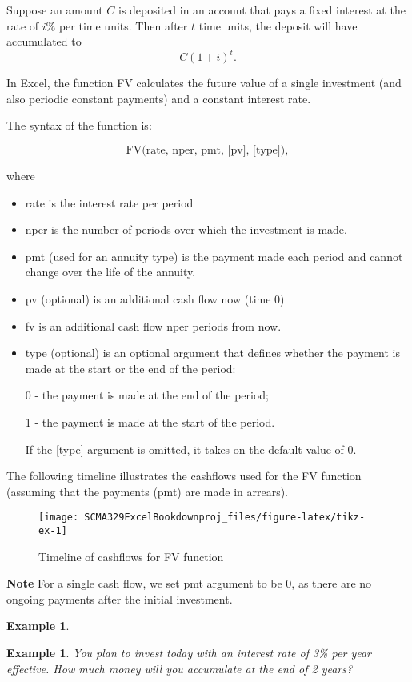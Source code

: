 \documentclass[
]{article}
\theoremstyle{definition}
\theoremstyle{definition}
\newtheorem{example}{Example}[section]
\theoremstyle{definition}
\theoremstyle{definition}
\theoremstyle{remark}
\begin{document}
Suppose an amount \(C\) is deposited in an account that pays a fixed
interest at the rate of \(i\)\% per time units. Then after \(t\) time units,
the deposit will have accumulated to \[C (1+i)^t.\]

In Excel, the function FV calculates the future value of a single
investment (and also periodic constant payments) and a constant interest
rate.

The syntax of the function is:

\[\text{FV(rate, nper, pmt, [pv], [type])},\]

where

\begin{itemize}
\item
  rate is the interest rate per period
\item
  nper is the number of periods over which the investment is made.
\item
  pmt (used for an annuity type) is the payment made each period and
  cannot change over the life of the annuity.
\item
  pv (optional) is an additional cash flow now (time 0)
\item
  fv is an additional cash flow nper periods from now.
\item
  type (optional) is an optional argument that defines whether the
  payment is made at the start or the end of the period:

  0 - the payment is made at the end of the period;

  1 - the payment is made at the start of the period.

  If the {[}type{]} argument is omitted, it takes on the default value
  of 0.
\end{itemize}

The following timeline illustrates the cashflows used for the FV
function (assuming that the payments (pmt) are made in arrears).

\begin{figure}

{\centering \texttt{[image: SCMA329ExcelBookdownproj\_files/figure-latex/tikz-ex-1]} 

}

\caption{Timeline of cashflows for FV function}\label{fig:tikz-ex}
\end{figure}

\textbf{Note} For a single cash flow, we set pmt argument to be 0, as there are no
ongoing payments after the initial investment.

\begin{example}
\protect\hypertarget{exm:unlabeled-div-3}{}\label{exm:unlabeled-div-3}

\textbf{Example 1}. \emph{You plan to invest today with an interest rate of 3\% per
year effective. How much money will you accumulate at the end of 2
years?}

\end{example}
\end{document}
